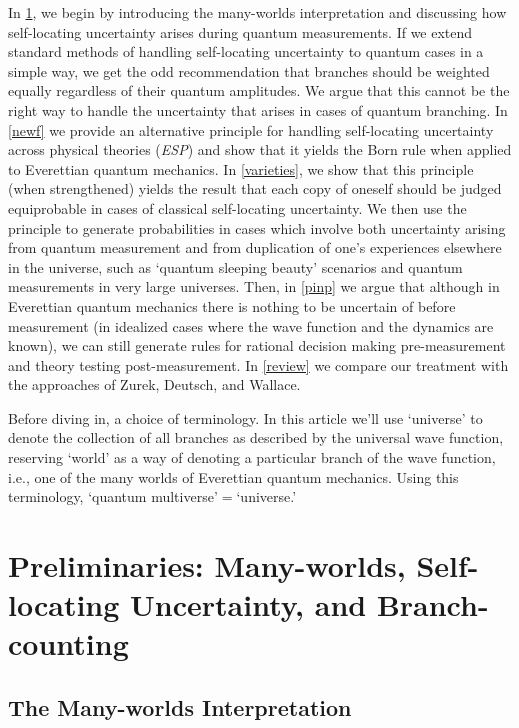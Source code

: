\documentclass[onecolumn,secnumarabic,amsmath,amssymb,balancelastpage,nofootinbib]{article}
\begin{document}
In \textsection \ref{prelim}, we begin by introducing the many-worlds interpretation and discussing how self-locating uncertainty arises during quantum measurements.  If we extend standard methods of handling self-locating uncertainty to quantum cases in a simple way, we get the odd recommendation that branches should be weighted equally regardless of their quantum amplitudes.  We argue that this cannot be the right way to handle the uncertainty that arises in cases of quantum branching.  In \textsection \ref{newf} we provide an alternative principle for handling self-locating uncertainty across physical theories (\emph{ESP}) and show that it yields the Born rule when applied to Everettian quantum mechanics.  In \textsection \ref{varieties}, we show that this principle (when strengthened) yields the result that each copy of oneself should be judged equiprobable in cases of classical self-locating uncertainty.  We then use the principle to generate probabilities in cases which involve both uncertainty arising from quantum measurement and from duplication of one's experiences elsewhere in the universe, such as `quantum sleeping beauty' scenarios and quantum measurements in very large universes.  Then, in \textsection \ref{pinp} we argue that although in Everettian quantum mechanics there is nothing to be uncertain of before measurement (in idealized cases where the wave function and the dynamics are known), we can still generate rules for rational decision making pre-measurement and theory testing post-measurement.  In \textsection \ref{review} we compare our treatment with the approaches of Zurek, Deutsch, and Wallace.

Before diving in, a choice of terminology.  In this article we'll use `universe' to denote the collection of all branches as described by the universal wave function,  reserving `world' as a way of denoting a particular branch of the wave function, i.e., one of the many worlds of Everettian quantum mechanics.  Using this terminology, `quantum multiverse'$=$`universe.'

\section{Preliminaries: Many-worlds, Self-locating Uncertainty, and Branch-counting}\label{prelim}

\subsection{The Many-worlds Interpretation}\label{introducingEQM}
\end{document}
